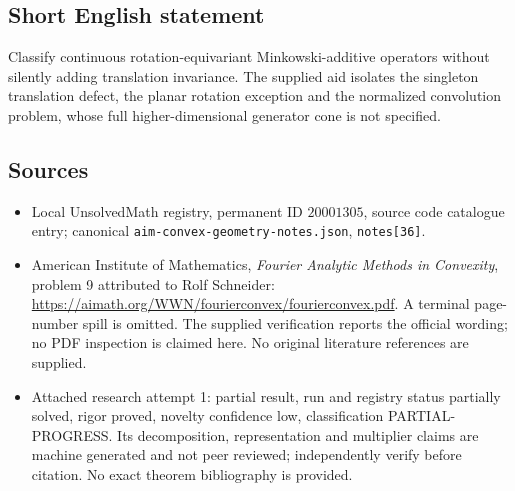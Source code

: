 \documentclass[11pt]{article}
\begin{document}
\subsection{Short English statement}
Classify continuous rotation-equivariant Minkowski-additive operators without silently adding translation invariance. The supplied aid isolates the singleton translation defect, the planar rotation exception and the normalized convolution problem, whose full higher-dimensional generator cone is not specified.
\subsection{Sources}
\begin{itemize}
\item Local UnsolvedMath registry, permanent ID $20001305$, source code catalogue entry; canonical \texttt{aim-convex-geometry-notes.json}, \texttt{notes[36]}.
\item American Institute of Mathematics, \emph{Fourier Analytic Methods in Convexity}, problem 9 attributed to Rolf Schneider: \url{https://aimath.org/WWN/fourierconvex/fourierconvex.pdf}. A terminal page-number spill is omitted. The supplied verification reports the official wording; no PDF inspection is claimed here. No original literature references are supplied.
\item Attached research attempt 1: partial result, run and registry status partially solved, rigor proved, novelty confidence low, classification PARTIAL-PROGRESS. Its decomposition, representation and multiplier claims are machine generated and not peer reviewed; independently verify before citation. No exact theorem bibliography is provided.
\end{itemize}
\end{document}
